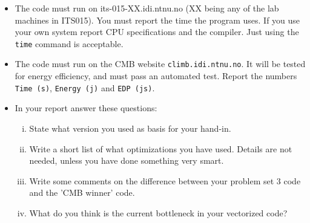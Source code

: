 \documentclass[10pt,a4paper]{article}
\begin{document}
\begin{enumerate}[a)]
\begin{itemize}
	\item The code must run on its-015-XX.idi.ntnu.no (XX being any of the lab machines in ITS015). You must report the time the program uses. If you use your own system report CPU specifications and the compiler. Just using the \texttt{time} command is acceptable. 
	\item The code must run on the CMB website \texttt{climb.idi.ntnu.no}. It will be tested for energy efficiency, and must pass an automated test. Report the numbers \texttt{Time (s)}, 	\texttt{Energy (j)} and \texttt{EDP (js)}.

\item In your report answer these questions:
\begin{enumerate}[i)]
	\item  State what version you used as basis for your hand-in.
	\item  Write a short list of what optimizations you have used. Details are not needed, unless you have done something very smart.
	\item  Write some comments on the difference between your problem set 3 code and the 'CMB winner' code.
	\item  What do you think is the current bottleneck in your vectorized code?
\end{enumerate}
\end{itemize}







\end{enumerate}
\end{document}
